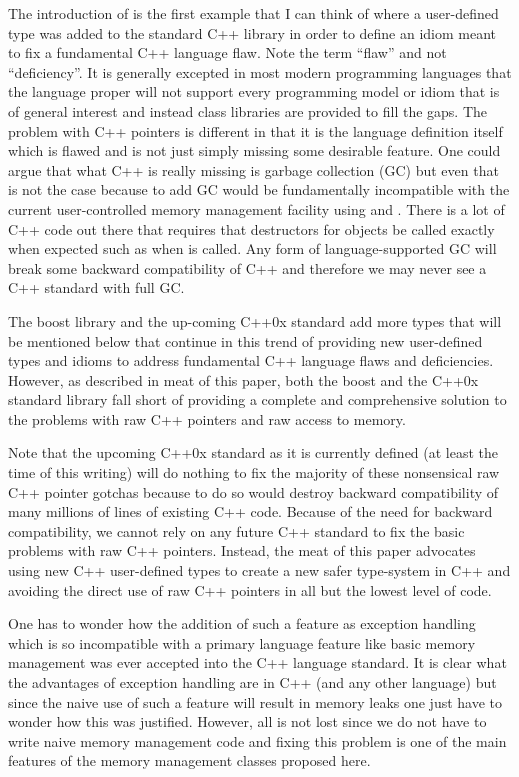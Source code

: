 \documentclass[pdf,ps2pdf,11pt]{SANDreport}
\begin{document}
The introduction of {} is the first example that I
can think of where a user-defined type was added to the standard C++
library in order to define an idiom meant to fix a fundamental C++
language flaw.  Note the term ``flaw'' and not ``deficiency''.  It is
generally excepted in most modern programming languages that the
language proper will not support every programming model or idiom that
is of general interest and instead class libraries are provided to
fill the gaps.  The problem with C++ pointers is different in that it
is the language definition itself which is flawed and is not just
simply missing some desirable feature.  One could argue that what C++
is really missing is garbage collection (GC) but even that is not the
case because to add GC would be fundamentally incompatible with the
current user-controlled memory management facility using {}
and {}.  There is a lot of C++ code out there that
requires that destructors for objects be called exactly when expected
such as when {} is called.  Any form of language-supported
GC will break some backward compatibility of C++ and therefore we may
never see a C++ standard with full GC.

The boost library and the up-coming C++0x standard add more types that
will be mentioned below that continue in this trend of providing new
user-defined types and idioms to address fundamental C++ language
flaws and deficiencies.  However, as described in meat of this paper,
both the boost and the C++0x standard library fall short of providing
a complete and comprehensive solution to the problems with raw C++
pointers and raw access to memory.

Note that the upcoming C++0x standard as it is currently defined (at
least the time of this writing) will do nothing to fix the majority of
these nonsensical raw C++ pointer gotchas because to do so would
destroy backward compatibility of many millions of lines of existing
C++ code.  Because of the need for backward compatibility, we cannot
rely on any future C++ standard to fix the basic problems with raw C++
pointers.  Instead, the meat of this paper advocates using new C++
user-defined types to create a new safer type-system in C++ and
avoiding the direct use of raw C++ pointers in all but the lowest
level of code.

One has to wonder how the addition of such a feature as exception
handling which is so incompatible with a primary language feature like
basic memory management was ever accepted into the C++ language
standard.  It is clear what the advantages of exception handling are
in C++ (and any other language) but since the naive use of such a
feature will result in memory leaks one just have to wonder how this
was justified.  However, all is not lost since we do not have to write
naive memory management code and fixing this problem is one of the
main features of the memory management classes proposed here.
\end{document}
